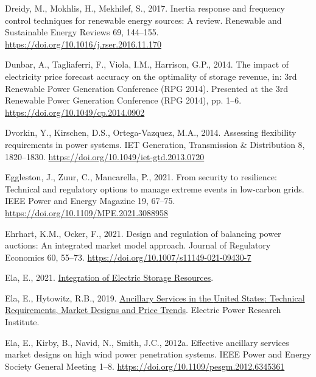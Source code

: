 \documentclass[12pt,a4paper,]{report}
\newlength{\cslhangindent}
\newenvironment{CSLReferences}[2] %
 {%
  \setlength{\parindent}{0pt}
  \ifodd #1 \everypar{\setlength{\hangindent}{\cslhangindent}}\ignorespaces\fi
  \ifnum #2 > 0
  \setlength{\parskip}{#2\baselineskip}
  \fi
 }%
 {}
\begin{document}
\begin{CSLReferences}{1}{0}
\leavevmode{}%
Dreidy, M., Mokhlis, H., Mekhilef, S., 2017. Inertia response and
frequency control techniques for renewable energy sources: {A} review.
Renewable and Sustainable Energy Reviews 69, 144--155.
\url{https://doi.org/10.1016/j.rser.2016.11.170}

\leavevmode{}%
Dunbar, A., Tagliaferri, F., Viola, I.M., Harrison, G.P., 2014. The
impact of electricity price forecast accuracy on the optimality of
storage revenue, in: 3rd {Renewable Power Generation Conference} ({RPG}
2014). Presented at the 3rd {Renewable Power Generation Conference}
({RPG} 2014), pp. 1--6. \url{https://doi.org/10.1049/cp.2014.0902}

\leavevmode{}%
Dvorkin, Y., Kirschen, D.S., Ortega-Vazquez, M.A., 2014. Assessing
flexibility requirements in power systems. IET Generation, Transmission
\& Distribution 8, 1820--1830.
\url{https://doi.org/10.1049/iet-gtd.2013.0720}

\leavevmode{}%
Eggleston, J., Zuur, C., Mancarella, P., 2021. From security to
resilience: {Technical} and regulatory options to manage extreme events
in low-carbon grids. IEEE Power and Energy Magazine 19, 67--75.
\url{https://doi.org/10.1109/MPE.2021.3088958}

\leavevmode{}%
Ehrhart, K.M., Ocker, F., 2021. Design and regulation of balancing power
auctions: An integrated market model approach. Journal of Regulatory
Economics 60, 55--73. \url{https://doi.org/10.1007/s11149-021-09430-7}

\leavevmode{}%
Ela, E., 2021.
\href{https://www.energy.gov/sites/prod/files/2021/02/f82/Energy\%20Storage_Ela_EPRI_0.pdf}{Integration
of {Electric Storage Resources}}.

\leavevmode{}%
Ela, E., Hytowitz, R.B., 2019.
\href{https://www.epri.com/research/products/000000003002015670}{Ancillary
{Services} in the {United States}: {Technical Requirements}, {Market
Designs} and {Price Trends}}. Electric Power Research Institute.

\leavevmode{}%
Ela, E., Kirby, B., Navid, N., Smith, J.C., 2012a. Effective ancillary
services market designs on high wind power penetration systems. IEEE
Power and Energy Society General Meeting 1--8.
\url{https://doi.org/10.1109/pesgm.2012.6345361}


\end{CSLReferences}
\end{document}
